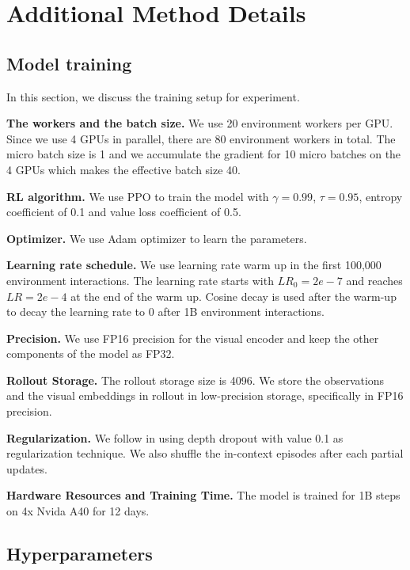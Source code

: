 \section{Additional Method Details}

\subsection{Model training}

In this section, we discuss the training setup for \method experiment. 

\textbf{The workers and the batch size.} We use 20 environment workers per GPU. Since we use 4 GPUs in parallel, there are 80 environment workers in total. The micro batch size is 1 and we accumulate the gradient for 10 micro batches on the 4 GPUs which makes the effective batch size 40.

\textbf{RL algorithm.} We use PPO \cite{schulman2017proximal} to train the model with $\gamma=0.99$, $\tau=0.95$, entropy coefficient of 0.1 and value loss coefficient of 0.5.

\textbf{Optimizer.} We use Adam \cite{kingma2014adam} optimizer to learn the parameters.

\textbf{Learning rate schedule.} We use learning rate warm up in the first 100,000 environment interactions. The learning rate starts with $LR_0=2e-7$ and reaches $LR=2e-4$ at the end of the warm up. Cosine decay \cite{loshchilov2017sgdr} is used after the warm-up to decay the learning rate to $0$ after 1B environment interactions. 

\textbf{Precision.} We use FP16 precision for the visual encoder and keep the other components of the model as FP32.

\textbf{Rollout Storage.} The rollout storage size is 4096. We store the observations and the visual embeddings in rollout in low-precision storage, specifically in FP16 precision.

\textbf{Regularization.} We follow \cite{reed2022generalist} in using depth dropout \cite{huang2016deep} with value 0.1 as regularization technique. We also shuffle the in-context episodes after each partial updates.

\textbf{Hardware Resources and Training Time.} The model is trained for 1B steps on 4x Nvida A40 for 12 days.

\subsection{Hyperparameters}
\label{sec:hyperparams} 

